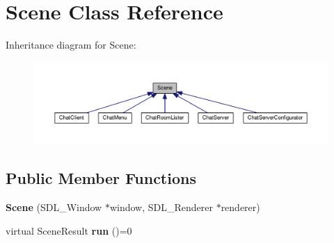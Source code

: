 \hypertarget{classScene}{}\section{Scene Class Reference}
\label{classScene}


Inheritance diagram for Scene\+:\nopagebreak
\begin{figure}[H]
\begin{center}
\leavevmode
\includegraphics[width=350pt]{classScene__inherit__graph}
\end{center}
\end{figure}
\subsection*{Public Member Functions}
\begin{DoxyCompactItemize}
\item 
{\bfseries Scene} (S\+D\+L\+\_\+\+Window $\ast$window, S\+D\+L\+\_\+\+Renderer $\ast$renderer)\hypertarget{classScene_a833a46b2dfbb25aeb88c281a6926bc17}{}\label{classScene_a833a46b2dfbb25aeb88c281a6926bc17}

\item 
virtual Scene\+Result {\bfseries run} ()=0\hypertarget{classScene_a3ffc2c3184e1fea5a53df4f8190b426b}{}\label{classScene_a3ffc2c3184e1fea5a53df4f8190b426b}

\end{DoxyCompactItemize}
